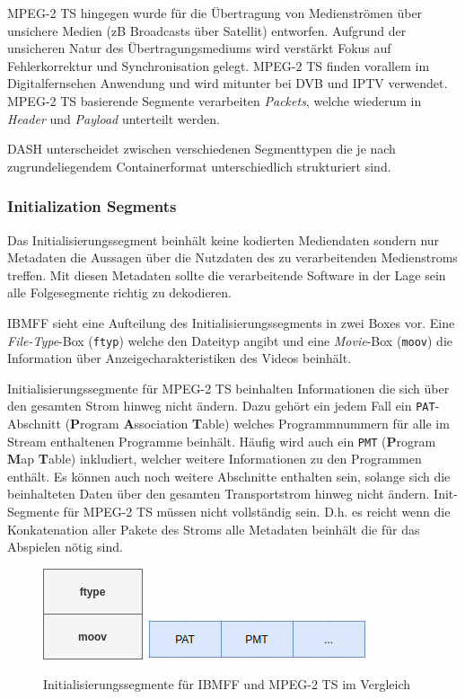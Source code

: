 \documentclass[paper = a4, fontsize = 12pt, parskip = half]{scrartcl} %
\def\attr#1{\texttt{#1}}
\begin{document}
MPEG-2 TS hingegen wurde für die Übertragung von Medienströmen über unsichere Medien (zB Broadcasts über Satellit) entworfen. Aufgrund der unsicheren Natur des Übertragungsmediums wird verstärkt Fokus auf Fehlerkorrektur und Synchronisation gelegt. MPEG-2 TS finden vorallem im Digitalfernsehen Anwendung und wird mitunter bei DVB und IPTV verwendet. MPEG-2 TS basierende Segmente verarbeiten \textit{Packets}, welche wiederum in \textit{Header} und \textit{Payload} unterteilt werden.

DASH unterscheidet zwischen verschiedenen Segmenttypen die je nach zugrundeliegendem Containerformat unterschiedlich strukturiert sind.

\subsubsection{Initialization Segments}
Das Initialisierungssegment beinhält keine kodierten Mediendaten sondern nur Metadaten die Aussagen über die Nutzdaten des zu verarbeitenden Medienstroms treffen. Mit diesen Metadaten sollte die verarbeitende Software in der Lage sein alle Folgesegmente richtig zu dekodieren.

IBMFF sieht eine Aufteilung des Initialisierungssegments in zwei Boxes vor. Eine \textit{File-Type}-Box (\attr{ftyp}) welche den Dateityp angibt und eine \textit{Movie}-Box (\attr{moov}) die Information über Anzeigecharakteristiken des Videos beinhält.

Initialisierungssegmente für MPEG-2 TS beinhalten Informationen die sich über den gesamten Strom hinweg nicht ändern. Dazu gehört ein jedem Fall ein \attr{PAT}-Abschnitt (\textbf{P}rogram \textbf{A}ssociation \textbf{T}able) welches Programmnummern für alle im Stream enthaltenen Programme beinhält. Häufig wird auch ein \attr{PMT} (\textbf{P}rogram \textbf{M}ap \textbf{T}able) inkludiert, welcher weitere Informationen zu den Programmen enthält. Es können auch noch weitere Abschnitte enthalten sein, solange sich die beinhalteten Daten über den gesamten Transportstrom hinweg nicht ändern.
Init-Segmente für MPEG-2 TS müssen nicht vollständig sein. D.h. es reicht wenn die Konkatenation aller Pakete des Stroms alle Metadaten beinhält die für das Abspielen nötig sind.

\begin{center}
	\begin{figure}[h]
		\centering
		\includegraphics{images/isobmff_init-seg.png}
		\includegraphics{images/mpeg2ts_init-seg.png}
		\caption{Initialisierungssegmente für IBMFF und MPEG-2 TS im Vergleich}
	\end{figure}
\end{center}
\end{document}
